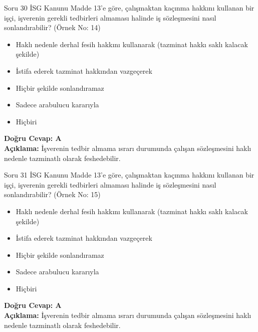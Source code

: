 \documentclass[12pt,a4paper]{article}
\begin{document}
\begin{testcard}{Soru 30}
    İSG Kanunu Madde 13'e göre, çalışmaktan kaçınma hakkını kullanan bir işçi, işverenin gerekli tedbirleri almaması halinde iş sözleşmesini nasıl sonlandırabilir? (Örnek No: 14)
    \begin{itemize}
        \item[A)] Haklı nedenle derhal fesih hakkını kullanarak (tazminat hakkı saklı kalacak şekilde)
        \item[B)] İstifa ederek tazminat hakkından vazgeçerek
        \item[C)] Hiçbir şekilde sonlandıramaz
        \item[D)] Sadece arabulucu kararıyla
        \item[E)] Hiçbiri
    \end{itemize}
    \tcblower
    \textbf{Doğru Cevap: A} \\
    \textbf{Açıklama:} İşverenin tedbir almama ısrarı durumunda çalışan sözleşmesini haklı nedenle tazminatlı olarak feshedebilir.
\end{testcard}

\begin{testcard}{Soru 31}
    İSG Kanunu Madde 13'e göre, çalışmaktan kaçınma hakkını kullanan bir işçi, işverenin gerekli tedbirleri almaması halinde iş sözleşmesini nasıl sonlandırabilir? (Örnek No: 15)
    \begin{itemize}
        \item[A)] Haklı nedenle derhal fesih hakkını kullanarak (tazminat hakkı saklı kalacak şekilde)
        \item[B)] İstifa ederek tazminat hakkından vazgeçerek
        \item[C)] Hiçbir şekilde sonlandıramaz
        \item[D)] Sadece arabulucu kararıyla
        \item[E)] Hiçbiri
    \end{itemize}
    \tcblower
    \textbf{Doğru Cevap: A} \\
    \textbf{Açıklama:} İşverenin tedbir almama ısrarı durumunda çalışan sözleşmesini haklı nedenle tazminatlı olarak feshedebilir.
\end{testcard}
\end{document}
